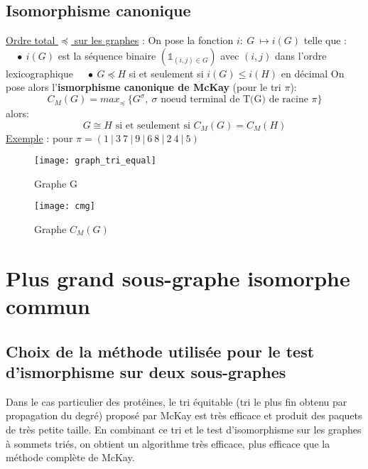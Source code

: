 \documentclass[a4paper, french, twoside]{article}
\begin{document}
\subsection{Isomorphisme canonique \cite{mckay_label}}
\noindent \underline{Ordre total $\preceq$ sur les graphes} : \newline \newline
On pose la fonction $i:\ G\ \longmapsto i(G)$ telle que : \newline
$\quad \bullet \ i(G)$ est la séquence binaire $(\mathds{1}_{(i,j)\in G})$ avec $(i,j)$ dans l'ordre lexicographique \newline
$\quad \bullet \ G \preceq H$ si et seulement si $i(G) \leq i(H)$ en décimal
\newline \newline
On pose alors l'\textbf{ismorphisme canonique de McKay} (pour le tri $\pi$):
\begin{equation}
    \boxed{C_M(G) = max_{\preceq}\ \lbrace G^{\sigma},\ \sigma \text{ noeud terminal de T(G) de racine } \pi \rbrace }
\end{equation}
alors:
\begin{equation}
    \boxed{G \cong H \text{ si et seulement si } C_M(G) = C_M(H)}
\end{equation}
\newline
\noindent \underline{Exemple} : pour $\pi = (1\ |\ 3\ 7\ |\ 9\ |\ 6\ 8\ |\ 2\ 4\ |\ 5)$

\begin{multicols}{2}
    \begin{figure}[H]
        \centering
        \texttt{[image: graph\_tri\_equal]}
        \caption{\label{fig: Graphe G}Graphe G}
    \end{figure}
    \vfill
    \begin{figure}[H]
        \centering
        \texttt{[image: cmg]}
        \caption{\label{fig: Isomorphe G} Graphe $C_M(G)$}
    \end{figure}
\end{multicols}

\section{Plus grand sous-graphe isomorphe commun}
\subsection{Choix de la méthode utilisée pour le test d'ismorphisme sur deux sous-graphes}
Dans le cas particulier des protéines, le tri équitable (tri le plus fin obtenu par propagation du degré) proposé par McKay est très efficace et produit des paquets de très petite taille.
En combinant ce tri et le test d'isomorphisme sur les graphes à sommets triés, on obtient un algorithme très efficace, plus efficace que la méthode complète de McKay. \newline
\end{document}
